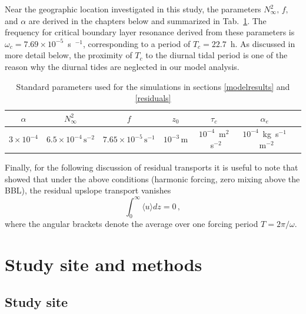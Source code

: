 Near the geographic location investigated in this study, the
parameters $N^2_\infty,\, f,$ and $\alpha$ are derived in the chapters
below and summarized in Tab.\ \ref{input}. The frequency for critical
boundary layer resonance derived from these parameters is $\omega_c =
7.69 \times 10^{-5}$~s~$^{-1}$, corresponding to a period of $T_c = 22.7$~h. As
discussed in more detail below, the proximity of $T_c$ to the diurnal
tidal period is one of the reason why the diurnal tides are neglected
in our model analysis.

\begin{table}
\caption{Standard parameters used for the simulations in sections
  \ref{modelresults} and \ref{residuals}}\label{input}
\begin{center}
\begin{tabular}{ccccccc}
\hline
\hline
$\alpha$ & $N_\infty^2$ & $f$ & $z_0$ & $\tau_c$ & $\alpha_e$ \\
\hline
$3 \times 10^{-4}$ & $6.5 \times 10^{-4}\, \text{s}^{-2}$ & $7.65 \times 
10^{-5}\, 
\text{s}^{-1}$ & $10^{-3}\, \text{m}$ & $10^{-4}$~m$^2$~s$^{-2}$ & 
$10^{-4}$~kg~s$^{-1}$~m$^{-2}$ \\
\hline
\end{tabular}
\end{center}
\end{table}

Finally, for the following discussion of residual transports it is
useful to note that \cite{UmlaufBurchard2011a} showed that under the
above conditions (harmonic forcing, zero mixing above the BBL), the
residual upslope transport vanishes
\begin{equation}
  \label{uint}
  \int_0^\infty \langle u \rangle dz = 0 \, ,
\end{equation}
where the angular brackets denote the average over one forcing period
$T = 2 \pi / \omega$.

\section{Study site and methods}\label{methods}

\subsection{Study site}

